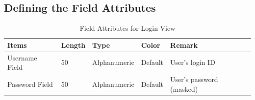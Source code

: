 \documentclass{article}
\begin{document}
\subsection{Defining the Field Attributes}
\begin{table}[h!]
\centering
\begin{tabularx}{\textwidth}{|l|l|l|l|X|}
\hline
\textbf{Items} & \textbf{Length} & \textbf{Type} & \textbf{Color} & \textbf{Remark} \\
\hline
Username Field & 50 & Alphanumeric & Default & User's login ID \\
\hline
Password Field & 50 & Alphanumeric & Default & User's password (masked) \\
\hline
\end{tabularx}
\caption{Field Attributes for Login View}
\end{table}
\end{document}
